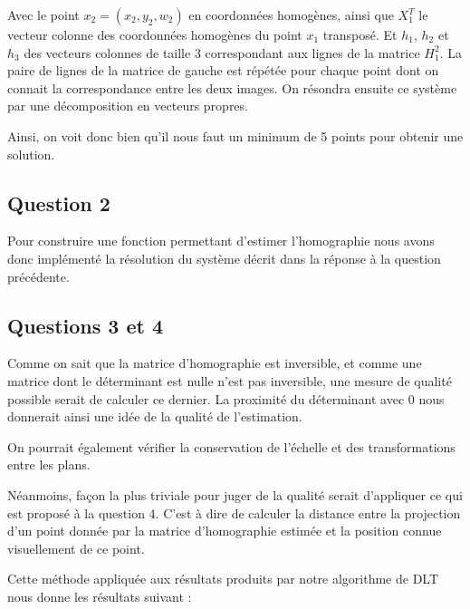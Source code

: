 \documentclass[12pt]{report}
\begin{document}
Avec le point $x_2=(x_2, y_2, w_2)$ en coordonnées homogènes, ainsi que $X_1^T$ le vecteur colonne des coordonnées homogènes du point $x_1$ transposé. Et $h_1$, $h_2$ et $h_3$ des vecteurs colonnes de taille 3 correspondant aux lignes de la matrice $H^2_1$.
La paire de lignes de la matrice de gauche est répétée pour chaque point dont on connait la correspondance entre les deux images. On résondra ensuite ce système par une décomposition en vecteurs propres.

Ainsi, on voit donc bien qu'il nous faut un minimum de 5 points pour obtenir une solution.

\subsection{Question 2}

Pour construire une fonction permettant d'estimer l'homographie nous avons donc implémenté la résolution du système décrit dans la réponse à la question précédente.

\subsection{Questions 3 et 4}

Comme on sait que la matrice d'homographie est inversible, et comme une matrice dont le déterminant est nulle n'est pas inversible, une mesure de qualité possible serait de calculer ce dernier. La proximité du déterminant avec 0 nous donnerait ainsi une idée de la qualité de l'estimation.

On pourrait également vérifier la conservation de l'échelle et des transformations entre les plans.

Néanmoins, façon la plus triviale pour juger de la qualité serait d'appliquer ce qui est proposé à la question 4. C'est à dire de calculer la distance entre la projection d'un point donnée par la matrice d'homographie estimée et la position connue visuellement de ce point.

Cette méthode appliquée aux résultats produits par notre algorithme de DLT nous donne les résultats suivant :
\end{document}
